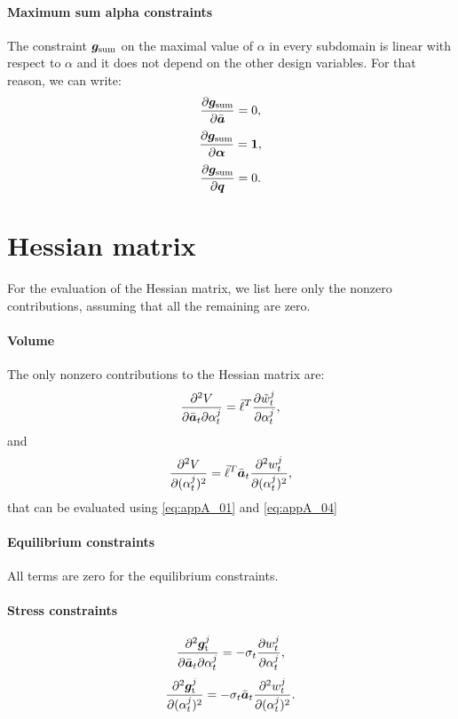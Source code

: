 \paragraph*{Maximum sum alpha constraints}
The constraint $\bm{g}_\text{sum}$ on the maximal value of $\alpha$ in every subdomain is linear with respect to $\alpha$ and it does not depend on the other design variables. For that reason, we can write:
\begin{equation}
    \frac{\partial\bm{g}_\text{sum}}{\partial\bar{\bm{a}}}=0,
\end{equation}
\begin{equation}
    \frac{\partial\bm{g}_\text{sum}}{\partial\bm{\alpha}}=\bm{1},
\end{equation}
\begin{equation}
    \frac{\partial\bm{g}_\text{sum}}{\partial\bm{q}}=0.
\end{equation}

\section{Hessian matrix}
For the evaluation of the Hessian matrix, we list here only the nonzero contributions, assuming that all the remaining are zero.
\paragraph*{Volume}
The only nonzero contributions to the Hessian matrix are: 
\begin{equation}
    \frac{\partial^2V}{\partial{\bar{\bm{a}}_t}\partial\alpha_t^j} = \bar{\ell}^T \frac{\partial\tilde{w}_t^j}{\partial\alpha_t^j},
\end{equation}
and
\begin{equation}
    \frac{\partial^2V}{\partial(\alpha_t^j)^2} = \bar{\ell}^T \bar{\bm{a}}_t \frac{\partial^2w_t^j}{\partial(\alpha_t^j)^2},
\end{equation}
that can be evaluated using \eqref{eq:appA_01} and \eqref{eq:appA_04}
\paragraph*{Equilibrium constraints}
All terms are zero for the equilibrium constraints.
\paragraph*{Stress constraints}
\begin{equation}
    \frac{\partial^2\bm{g}_\text{t}^j}{\partial{\bar{\bm{a}}_t}\partial\alpha_t^j} = -\sigma_t \frac{\partial w_t^j}{\partial\alpha_t^j},
\end{equation}
\begin{equation}
    \frac{\partial^2\bm{g}_\text{t}^j}{\partial(\alpha_t^j)^2} = -\sigma_t  \bar{\bm{a}}_t \frac{\partial^2w_t^j}{\partial(\alpha_t^j)^2}.
\end{equation}
